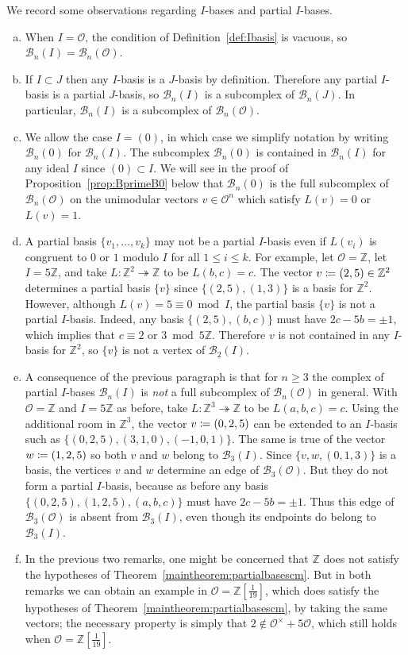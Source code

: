 \documentclass[11 pt]{article}
\theoremstyle{plain}
\theoremstyle{definition}
\numberwithin{equation}{section}
\newcommand\Z{\ensuremath{\mathbb{Z}}}
\renewcommand{\O}{\mathcal{O}}
\newcommand\PartialBases{\ensuremath{\mathcal{B}}}
\newcommand{\PB}{\PartialBases}
\newcommand\onto{\twoheadrightarrow}
\newcommand\coloneq{\mathrel{\mathop:}\mkern-1.2mu=}
\newcommand{\change}{}
\begin{document}
We record some observations regarding $I$-bases and partial $I$-bases.
\begin{enumerate}[(a),topsep=2pt,itemsep=2pt,parsep=2pt]
\item 
When $I = \O$, the condition of Definition~\ref{def:Ibasis} is vacuous, so $\PartialBases_n(I) = \PartialBases_n(\O)$.
\item If $I\subset J$ then any $I$-basis is a $J$-basis by definition.  Therefore any 
partial $I$-basis is a partial $J$-basis, so $\PartialBases_n(I)$ is a subcomplex of $\PartialBases_n(J)$. In particular, $\PB_n(I)$ is a subcomplex of $\PB_n(\O)$.
\item We allow the case $I=(0)$, in which case we simplify notation by writing $\PartialBases_n(0)$ 
for $\PartialBases_n(I)$.  The subcomplex $\PartialBases_n(0)$ is contained in $\PartialBases_n(I)$ for any ideal 
$I$ since $(0)\subset I$.  We will see in the proof of Proposition~\ref{prop:BprimeB0} below that
$\PartialBases_n(0)$ is the full subcomplex of $\PartialBases_n(\O)$ on the unimodular vectors 
$v\in \O^n$ which satisfy $L(v)=0$ or $L(v)=1$.
\change %
\item A partial basis $\{v_1,\ldots,v_k\}$ may not be a 
partial $I$-basis even if $L(v_i)$ is congruent to $0$ or $1$ modulo $I$ for all $1 \leq i \leq k$.
For example, let $\O=\Z$, let $I=5\Z$, and take $L\colon\Z^2\onto\Z$ to be $L(b,c)=c$. 
The vector $v\coloneq (2,5)\in \Z^2$ determines a partial basis $\{v\}$ since 
$\{(2,5),(1,3)\}$ is a basis for $\Z^2$.  However, although $L(v)=5\equiv 0\bmod I$, 
the partial basis $\{v\}$ is not a partial $I$-basis.  Indeed, any basis $\{(2,5),(b,c)\}$ 
must have $2c-5b=\pm1$, which implies that $c\equiv 2\text{ or }3\bmod{5\Z}$.  Therefore 
$v$ is not contained in any $I$-basis for $\Z^2$, so $\{v\}$ is not a vertex of $\PB_2(I)$.
\item A consequence of the previous paragraph is that  for $n\geq 3$ the complex of partial $I$-bases $\PartialBases_n(I)$ is \emph{not} a full subcomplex of 
$\PartialBases_n(\O)$ in general. With $\O=\Z$ and $I=5\Z$ as before, take $L\colon\Z^3\onto\Z$ to be $L(a,b,c)=c$. Using the additional room in $\Z^3$, the vector $v\coloneq (0,2,5)$ can be extended to an $I$-basis such as $\{(0,2,5),(3,1,0),(-1,0,1)\}$.
The same is true of the vector $w\coloneq (1,2,5)$ so both $v$ and $w$ belong to $\PB_3(I)$. Since $\{v,w,(0,1,3)\}$ is a basis, the vertices $v$ and $w$ determine an edge of $\PB_3(\O)$. But they do not form a partial $I$-basis, because as before any basis $\{(0,2,5),(1,2,5),(a,b,c)\}$ must have $2c-5b=\pm 1$. Thus this edge of $\PB_3(\O)$ is absent from $\PB_3(I)$, even though its endpoints do belong to $\PB_3(I)$.
\item In the previous two remarks, one might be concerned that $\Z$ does not satisfy the hypotheses of Theorem~\ref{maintheorem:partialbasescm}. But in both remarks we can obtain an example in $\O=\Z[\frac{1}{19}]$, which does satisfy  the hypotheses of Theorem~\ref{maintheorem:partialbasescm}, by taking the same vectors; the necessary property is simply that $2\notin \O^\times +5\O$, which still holds when $\O=\Z[\frac{1}{19}]$.
\end{enumerate}
\end{document}
